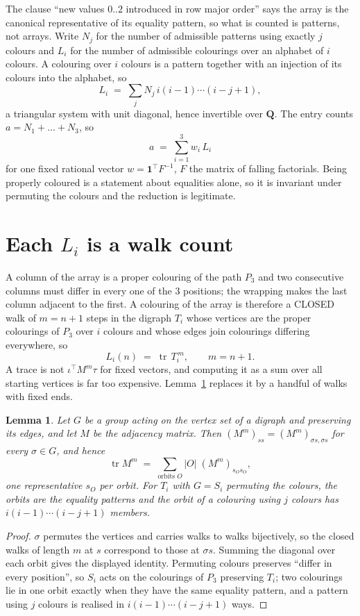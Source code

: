 \documentclass[11pt,a4paper]{article}
\theoremstyle{plain}
\newtheorem{lemma}[theorem]{Lemma}
\theoremstyle{definition}
\begin{document}
The clause ``new values $0..2$ introduced in row major order'' says the array is the
canonical representative of its equality pattern, so what is counted is patterns, not arrays.
Write $N_j$ for the number of admissible patterns using exactly $j$ colours and $L_i$ for the
number of admissible colourings over an alphabet of $i$ colours. A colouring over $i$ colours
is a pattern together with an injection of its colours into the alphabet, so
\[
L_i\;=\;\sum_j N_j\,i(i-1)\cdots(i-j+1),
\]
a triangular system with unit diagonal, hence invertible over $\mathbf{Q}$. The entry counts
$a=N_1+\dots+N_{3}$, so
\[
a\;=\;\sum_{i=1}^{3}w_i\,L_i
\]
for one fixed rational vector $w=\mathbf{1}^{\!\top}F^{-1}$, $F$ the matrix of falling
factorials. Being properly coloured is a statement about equalities alone, so it is invariant
under permuting the colours and the reduction is legitimate.

\section{Each $L_i$ is a walk count}

A column of the array is a proper colouring of the path $P_{3}$ and two consecutive
columns must differ in every one of the $3$ positions; the wrapping makes the last column
adjacent to the first. A colouring of the array is therefore a CLOSED walk of $m=n+1$ steps
in the digraph $T_i$ whose vertices are the proper colourings of $P_{3}$ over $i$ colours
and whose edges join colourings differing everywhere, so
\[
L_i(n)\;=\;\operatorname{tr}\,T_i^{\,m},\qquad m=n+1.
\]
A trace is not $\iota^{\!\top}M^m\tau$ for fixed vectors, and computing it as a sum over all
starting vertices is far too expensive. Lemma~\ref{lem:trace} replaces it by a handful of
walks with fixed ends.

\begin{lemma}\label{lem:trace}
Let $G$ be a group acting on the vertex set of a digraph and preserving its edges, and let $M$
be the adjacency matrix. Then $(M^m)_{ss}=(M^m)_{\sigma s,\sigma s}$ for every
$\sigma\in G$, and hence
\[
\operatorname{tr} M^m\;=\;\sum_{\text{orbits }O}|O|\;(M^m)_{s_O s_O} ,
\]
one representative $s_O$ per orbit. For $T_i$ with $G=S_i$ permuting the colours, the orbits
are the equality patterns and the orbit of a colouring using $j$ colours has
$i(i-1)\cdots(i-j+1)$ members.
\end{lemma}

\begin{proof}
$\sigma$ permutes the vertices and carries walks to walks bijectively, so the closed walks of
length $m$ at $s$ correspond to those at $\sigma s$. Summing the diagonal over each orbit
gives the displayed identity. Permuting colours preserves ``differ in every position'', so
$S_i$ acts on the colourings of $P_{3}$ preserving $T_i$; two colourings lie in one orbit
exactly when they have the same equality pattern, and a pattern using $j$ colours is realised
in $i(i-1)\cdots(i-j+1)$ ways.
\end{proof}
\end{document}
